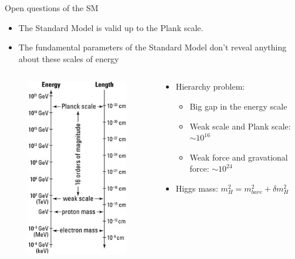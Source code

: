 \documentclass{beamer}
\begin{document}
\begin{frame}{Open questions of the SM}
    \begin{itemize}
        \item The Standard Model is valid up to the Plank scale.
        \item The fundamental parameters of the Standard Model don’t reveal anything about these scales of energy
    \end{itemize}
    \begin{columns}
        \begin{column}{0.3\textwidth}
            \begin{figure}
                \includegraphics[scale=0.4]{figures/energy_scale.jpg}
            \end{figure}
        \end{column}
        \begin{column}{0.7\textwidth}
             \begin{itemize}
                \item Hierarchy problem:
                \begin{itemize}
                    \item Big gap in the energy scale
                    \item Weak scale and Plank scale: $\sim 10^{16}$
                    \item Weak force and gravational force: $\sim 10^{24}$
                \end{itemize}
                \item Higgs mass: $m^2_H = m^2_{bare} + \delta m^2_H$

\end{itemize}
\end{column}
\end{columns}
\end{frame}
\end{document}
